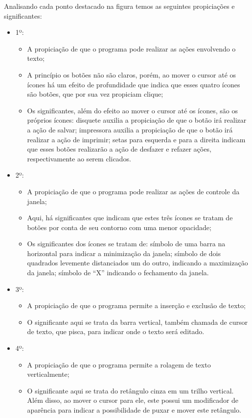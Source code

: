 Analisando cada ponto destacado na figura temos as seguintes propiciações e significantes:
\begin{itemize}
\item 1º:
    \begin{itemize}
        \item A propiciação de que o programa pode realizar as ações envolvendo o texto;
        \item A princípio os botões não são claros, porém, ao mover o cursor até os ícones há um efeito de profundidade que indica que esses quatro ícones são botões, que por sua vez propiciam clique;
        \item Os significantes, além do efeito ao mover o cursor até os ícones, são os próprios ícones: disquete auxilia a propiciação de que o botão irá realizar a ação de salvar; impressora auxilia a propiciação de que o botão irá realizar a ação de imprimir; setas para esquerda e para a direita indicam que esses botões realizarão a ação de desfazer e refazer ações, respectivamente ao serem clicados.
    \end{itemize}
\item 2º:
    \begin{itemize}
        \item A propiciação de que o programa pode realizar as ações de controle da janela;
        \item Aqui, há significantes que indicam que estes três ícones se tratam de botões por conta de seu contorno com uma menor opacidade;
        \item Os significantes dos ícones se tratam de: símbolo de uma barra na horizontal para indicar a minimização da janela; símbolo de dois quadrados levemente distanciados um do outro, indicando a maximização da janela; símbolo de ``X'' indicando o fechamento da janela.
    \end{itemize}
\item 3º:
    \begin{itemize}
        \item A propiciação de que o programa permite a inserção e exclusão de texto;
        \item O significante aqui se trata da barra vertical, também chamada de cursor de texto, que pisca, para indicar onde o texto será editado.
    \end{itemize}
\item 4º:
    \begin{itemize}
        \item A propiciação de que o programa permite a rolagem de texto verticalmente;
        \item O significante aqui se trata do retângulo cinza em um trilho vertical. Além disso, ao mover o cursor para ele, este possui um modificador de aparência para indicar a possibilidade de puxar e mover este retângulo.
    \end{itemize}
\end{itemize}

